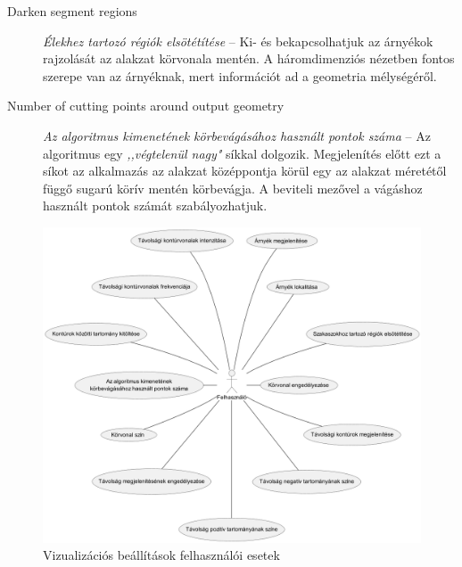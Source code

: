 \begin{description}
    \item[Darken segment regions] \textit{Élekhez tartozó régiók elsötétítése} -- Ki- és bekapcsolhatjuk az árnyékok rajzolását az alakzat körvonala mentén. A háromdimenziós nézetben fontos szerepe van az árnyéknak, mert információt ad a geometria mélységéről.        \item[Number of cutting points around output geometry] \textit{Az algoritmus kimenetének körbevágásához használt pontok száma} -- Az algoritmus egy \textit{,,végtelenül nagy"} síkkal dolgozik. Megjelenítés előtt ezt a síkot az alkalmazás az alakzat középpontja körül egy az alakzat méretétől függő sugarú körív mentén körbevágja. A beviteli mezővel a vágáshoz használt pontok számát szabályozhatjuk.
\end{description}

\begin{figure}[H]
    \centering
    \includegraphics[width=1\linewidth]{images/usecase_visualization_settings.png}
    \caption{Vizualizációs beállítások felhasználói esetek}
    \label{fig:usecase_visualization_settings-1}
\end{figure}

